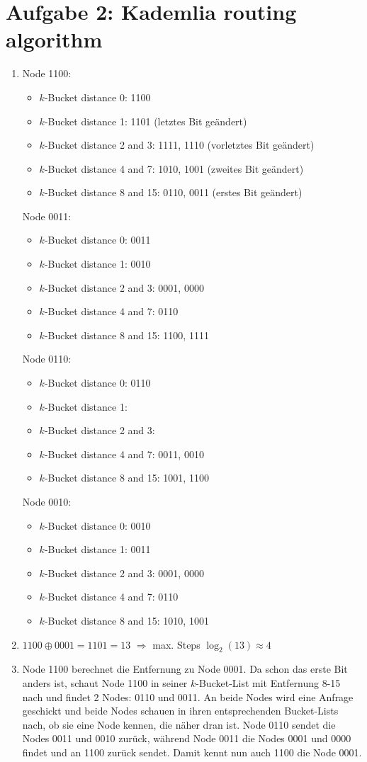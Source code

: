 \documentclass{article}
\begin{document}
	\section*{Aufgabe 2: Kademlia routing algorithm}
	\begin{enumerate}[label=(\alph*)]
		\item Node 1100:
		\begin{itemize}
			\item $k$-Bucket distance 0: 1100
			\item $k$-Bucket distance 1: 1101 (letztes Bit geändert)
			\item $k$-Bucket distance 2 and 3: 1111, 1110 (vorletztes Bit geändert)
			\item $k$-Bucket distance 4 and 7: 1010, 1001 (zweites Bit geändert)
			\item $k$-Bucket distance 8 and 15: 0110, 0011 (erstes Bit geändert)
		\end{itemize}
		Node 0011:
		\begin{itemize}
			\item $k$-Bucket distance 0: 0011
			\item $k$-Bucket distance 1: 0010
			\item $k$-Bucket distance 2 and 3: 0001, 0000
			\item $k$-Bucket distance 4 and 7: 0110
			\item $k$-Bucket distance 8 and 15: 1100, 1111
		\end{itemize}
		Node 0110:
		\begin{itemize}
			\item $k$-Bucket distance 0: 0110
			\item $k$-Bucket distance 1:
			\item $k$-Bucket distance 2 and 3:
			\item $k$-Bucket distance 4 and 7: 0011, 0010
			\item $k$-Bucket distance 8 and 15: 1001, 1100
		\end{itemize}
		Node 0010:
		\begin{itemize}
			\item $k$-Bucket distance 0: 0010
			\item $k$-Bucket distance 1: 0011
			\item $k$-Bucket distance 2 and 3: 0001, 0000
			\item $k$-Bucket distance 4 and 7: 0110
			\item $k$-Bucket distance 8 and 15: 1010, 1001
		\end{itemize}
		\item $1100 \oplus 0001 = 1101 = 13$ $\Rightarrow$ max. Steps $\log_2(13) \approx 4$
		\item Node 1100 berechnet die Entfernung zu Node 0001. Da schon das erste Bit anders ist, schaut Node 1100 in seiner $k$-Bucket-List mit Entfernung 8-15 nach und findet 2 Nodes: 0110 und 0011. An beide Nodes wird eine Anfrage geschickt und beide Nodes schauen in ihren entsprechenden Bucket-Lists nach, ob sie eine Node kennen, die näher dran ist. Node 0110 sendet die Nodes 0011 und 0010 zurück, während Node 0011 die Nodes 0001 und 0000 findet und an 1100 zurück sendet. Damit kennt nun auch 1100 die Node 0001.
	\end{enumerate}
\end{document}
